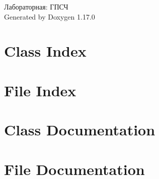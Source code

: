 \documentclass[twoside]{book}
\newcommand{\+}{\discretionary{\mbox{\scriptsize$\hookleftarrow$}}{}{}}
\newcommand{\clearemptydoublepage}{%
    \newpage{\pagestyle{empty}\cleardoublepage}%
  }
\begin{document}
  \raggedbottom
    \hypersetup{pageanchor=false,
                bookmarksnumbered=true,
                pdfencoding=unicode
               }
  \begin{titlepage}
  \vspace*{7cm}
  \begin{center}%
  {\Large Лабораторная:\+ ГПСЧ}\\
  \vspace*{1cm}
  {\large Generated by Doxygen 1.17.0}\\
  \end{center}
  \end{titlepage}
  \clearemptydoublepage
  \tableofcontents
  \clearemptydoublepage
  \hypersetup{pageanchor=true}

\chapter{Class Index}

\chapter{File Index}

\chapter{Class Documentation}








\chapter{File Documentation}








  \backmatter
  \newpage
  \clearemptydoublepage
  \printindex
\end{document}
